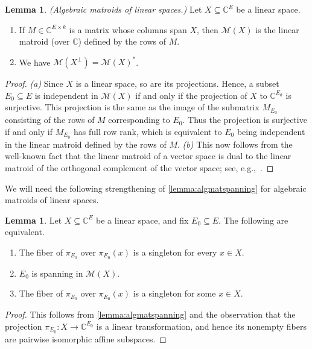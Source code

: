 \documentclass[11pt,a4paper,dvipsnames]{scrartcl}
\theoremstyle{definition}
\newtheorem{lemma}[theorem]{Lemma}
\newcommand{\CC}{\mathbb{C}}
\newcommand{\algmat}[1]{\mathcal{M}(#1)}
\begin{document}
\begin{lemma}\label{lemma:linearalgebraicmatroid} \emph{(Algebraic matroids of linear spaces.)} 
    Let $X \subseteq \CC^E$ be a linear space.
    \begin{enumerate}
        \item  If $M \in \CC^{E \times k}$ is a matrix whose columns span $X$, then $\algmat{X}$ is the linear matroid (over $\CC$) defined by the rows of $M$.
        \item We have $\algmat{X^\perp} = \algmat{X}^*$.%
    \end{enumerate}
\end{lemma}
\begin{proof}
    \textit{(a)} Since $X$ is a linear space, so are its projections. Hence, a subset $E_0 \subseteq E$ is independent in $\algmat{X}$ if and only if the projection of $X$ to $\CC^{E_0}$ is surjective. This projection is the same as the image of the submatrix $M_{E_0}$ consisting of the rows of $M$ corresponding to $E_0$. Thus the projection is surjective if and only if $M_{E_0}$ has full row rank, which is equivalent to $E_0$ being independent in the linear matroid defined by the rows of $M$. \textit{(b)} This now follows from the well-known fact that the linear matroid of a vector space is dual to the linear matroid of the orthogonal complement of the vector space; see, e.g.,~\cite[Section 2.2]{oxley_2011}.
\end{proof}
We will need the following strengthening of \cref{lemma:algmatspanning} for algebraic matroids of linear spaces.
\begin{lemma}\label{lemma:linearspanning}
    Let $X \subseteq \CC^E$ be a linear space, and fix $E_0 \subseteq E$. The following are equivalent.
    \begin{enumerate}
        \item The fiber of $\pi_{E_0}$ over $\pi_{E_0}(x)$ is a singleton for every $x \in X$.
        \item $E_0$ is spanning in $\algmat{X}$.
        \item The fiber of $\pi_{E_0}$  over $\pi_{E_0}(x)$ is a singleton for some $x \in X$.
    \end{enumerate}
\end{lemma}
\begin{proof}
    This follows from \cref{lemma:algmatspanning} and the observation that the projection $\pi_{E_0} : X \to \CC^{E_0}$ is a linear transformation, and hence its nonempty fibers are pairwise isomorphic affine subspaces.
\end{proof}
\end{document}
